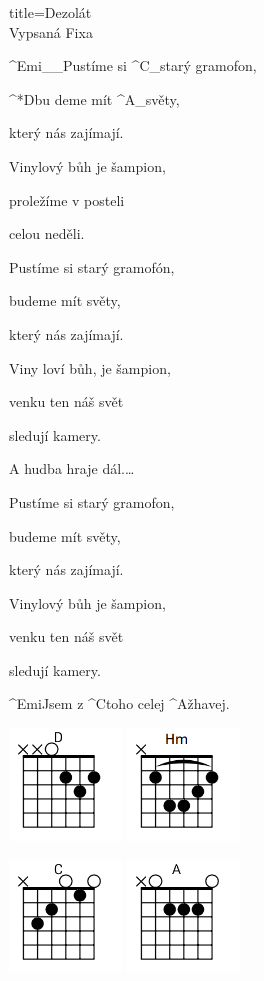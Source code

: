 \begin{song}{title=\predtitle\centering Dezolát\\\large Vypsaná Fixa \vspace*{-0.3cm}}
\begin{centerjustified}
\begin{varwidth}[t]{0.48\textwidth}
\sloka  %
	^{Emi{\color{white}\_\_}}Pustíme si ^{C{\color{white}\_}}starý gramofon,
	
	^*{D}bu deme mít ^{A{\color{white}\_}}světy, 
	
	který nás zajímají.
	
	Vinylový bůh je šampion,
	
	proležíme v posteli
	
	celou neděli.
	
	Pustíme si starý gramofón,
	
	budeme mít světy,
	
	který nás zajímají.
	
	Viny loví bůh, je šampion,
	
	venku ten náš svět 
	
	sledují kamery.
	
	\phantom{h}
	
	A hudba hraje dál.\elipsa\dots
	
	\phantom{h}	
	
	Pustíme si starý gramofon,
	
	budeme mít světy,
	
	který nás zajímají.
	
	Vinylový bůh je šampion,
	
	venku ten náš svět
	
	sledují kamery.
	
	\phantom{j}
	
	^{Emi}Jsem z ^{C}toho celej ^{A}žhavej.
	
\includegraphics[width=3cm]{../Akordy/d.png}
\includegraphics[width=3cm]{../Akordy/hm.png}

\includegraphics[width=3cm]{../Akordy/c.png}
\includegraphics[width=3cm]{../Akordy/a.png}
	

\end{varwidth}
\end{centerjustified}
\end{song}
